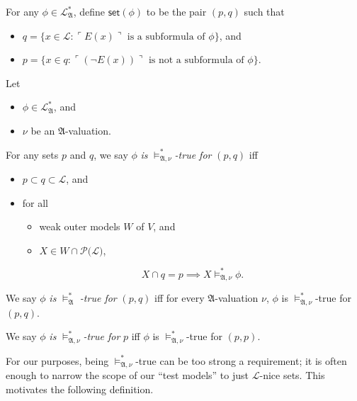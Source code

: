 \documentclass[12pt]{article}
\numberwithin{equation}{section}
\begin{document}
\begin{defi}
For any $\phi \in \mathcal{L}^{*}_{\mathfrak{A}}$, define $\mathsf{set}(\phi)$ to be the pair $(p, q)$ such that
\begin{itemize}
    \item $q = \{x \in \mathcal{L} : \ulcorner E(x) \urcorner \text{ is a subformula of } \phi\}$, and
    \item $p = \{x \in q : \ulcorner (\neg E(x)) \urcorner \text{ is not a subformula of } \phi\}$.
\end{itemize}
\end{defi}

\begin{defi}
Let 
\begin{itemize}
    \item $\phi \in \mathcal{L}^{*}_{\mathfrak{A}}$, and
    \item $\nu$ be an $\mathfrak{A}$-valuation.
\end{itemize}
For any sets $p$ and $q$, we say $\phi$ \emph{is} $\models^*_{\mathfrak{A}, \nu}$\emph{-true for} $(p, q)$ iff 
\begin{itemize}
    \item $p \subset q \subset \mathcal{L}$, and
    \item for all 
    \begin{itemize}[label=$\circ$]
        \item weak outer models $W$ of $V$, and
        \item $X \in W \cap \mathcal{P}(\mathcal{L)}$, 
    \end{itemize}
    $$X \cap q = p \implies X \models^*_{\mathfrak{A}, \nu} \phi.$$
\end{itemize}

We say $\phi$ \emph{is} $\models^*_{\mathfrak{A}}$ \emph{-true for} $(p, q)$ iff for every $\mathfrak{A}$-valuation $\nu$, $\phi$ is $\models^*_{\mathfrak{A}, \nu}$-true for $(p, q)$.

We say $\phi$ \emph{is} $\models^*_{\mathfrak{A}, \nu}$\emph{-true for} $p$ iff $\phi$ is $\models^*_{\mathfrak{A}, \nu}$-true for $(p, p)$.
\end{defi}

For our purposes, being $\models^*_{\mathfrak{A}, \nu}$-true can be too strong a requirement; it is often enough to narrow the scope of our ``test models'' to just $\mathcal{L}$-nice sets. This motivates the following definition.
\end{document}
